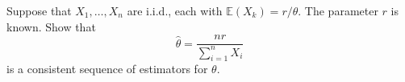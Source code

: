 \documentclass[addpoints]{exam}
\begin{document}
\begin{questions}
		\newpage
			
		\question[5] Suppose that $X_{1}, \dots, X_{n}$ are i.i.d., each with $\mathbb{E}(X_{k}) = r/\theta$. The parameter $r$ is known. Show that $$\hat{\theta} = \frac{nr}{\sum_{i=1}^{n}X_{i}}$$ is a consistent sequence of estimators for $\theta$.
	\end{questions}
\end{document}
